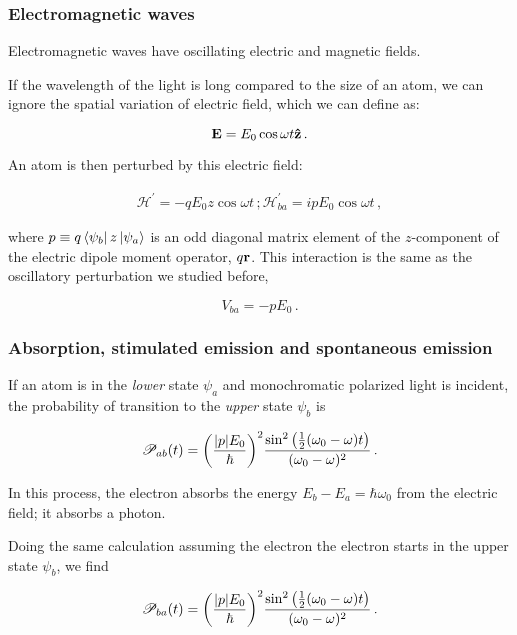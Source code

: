 \documentclass[12pt, titlepage]{article}
\begin{document}
\subsubsection{Electromagnetic waves}
Electromagnetic waves have oscillating electric and magnetic fields.


If the wavelength of the light is long compared to the size of an atom, we can ignore the spatial variation of electric field, which we can define as:

\begin{equation}
	\vb{E} = E_0\cos\omega t \vu{z} \,.
\end{equation}

An atom is then perturbed by this electric field:

\begin{align}
	\mathcal{H}^\prime = -q E_0 z \cos\omega t \,;
	\mathcal{H}^\prime_{ba} = i pE_0 \cos\omega t\,,
\end{align}

where $p \equiv q\bra{\psi_b}z\ket{\psi_a}$ is an odd diagonal matrix element of the $z$-component of the electric dipole moment operator, $q\vb{r}$. This interaction is the same as the oscillatory perturbation we studied before,

\begin{equation}
	V_{ba} = -pE_0 \,.
\end{equation}

\subsubsection{Absorption, stimulated emission and spontaneous emission}
If an atom is in the \textit{lower} state $\psi_a$ and monochromatic polarized light is incident, the probability of transition to the \textit{upper} state $\psi_b$ is

\begin{equation}
	\mathscr{P}_{ab}(t) = \qty(\frac{|p|E_0}{\hbar})^2\frac{\sin^2\qty(\frac{1}{2}(\omega_0 - \omega)t)}{(\omega_0 - \omega)^2} \,.
\end{equation}

In this process, the electron absorbs the energy $E_b - E_a = \hbar\omega_0$ from the electric field; it absorbs a photon.

Doing the same calculation assuming the electron the electron starts in the upper state $\psi_b$, we find

\begin{equation}
	\mathscr{P}_{ba}(t) = \qty(\frac{|p|E_0}{\hbar})^2\frac{\sin^2\qty(\frac{1}{2}(\omega_0 - \omega)t)}{(\omega_0 - \omega)^2} \,.
\end{equation}
\end{document}
